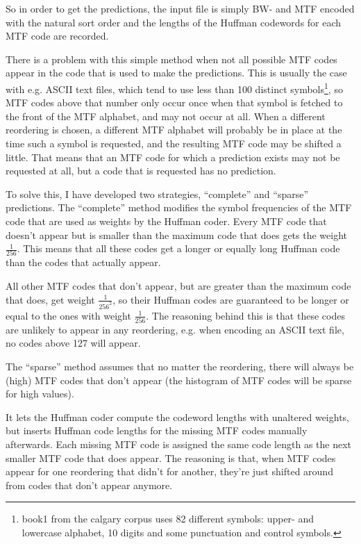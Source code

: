 \documentclass[a4paper]{scrreprt}
\begin{document}
So in order to get the predictions, the input file is simply BW- and MTF encoded
with the natural sort order and the lengths of the Huffman codewords for each
MTF code are recorded.

There is a problem with this simple method when not all possible MTF codes
appear in the code that is used to make the predictions. This is usually the
case with e.g. ASCII text files, which tend to use less than 100 distinct
symbols\footnote{book1 from the calgary corpus uses 82 different symbols:
upper- and lowercase alphabet, 10 digits and some punctuation and control
symbols.}, so MTF codes above that number only occur once when that symbol is
fetched to the front of the MTF alphabet, and may not occur at all.
When a different reordering is chosen, a different MTF alphabet will probably be
in place at the time such a symbol is requested, and the resulting MTF code may
be shifted a little. That means that an MTF code for which a prediction exists
may not be requested at all, but a code that is requested has no prediction.

To solve this, I have developed two strategies, ``complete'' and ``sparse''
predictions.
The ``complete'' method modifies the symbol frequencies of the MTF code that are
used as weights by the Huffman coder. Every MTF code that doesn't appear but is
smaller than the maximum code that does gets the weight \(\frac{1}{256}\). This
means that all these codes get a longer or equally long Huffman code than the
codes that actually appear.

All other MTF codes that don't appear, but are greater than the maximum code
that does, get weight \(\frac{1}{256^2}\), so their Huffman codes are guaranteed
to be longer or equal to the ones with weight \(\frac{1}{256}\). The reasoning
behind this is that these codes are unlikely to appear in any reordering, e.g.
when encoding an ASCII text file, no codes above 127 will appear.

The ``sparse'' method assumes that no matter the reordering, there will always
be (high) MTF codes that don't appear (the histogram of MTF codes will be
sparse for high values).

It lets the Huffman coder compute the codeword lengths with unaltered weights,
but inserts Huffman code lengths for the missing MTF codes manually afterwards.
Each missing MTF code is assigned the same code length as the next smaller MTF
code that does appear. The reasoning is that, when MTF codes appear for one
reordering that didn't for another, they're just shifted around from codes that
don't appear anymore.
\end{document}
